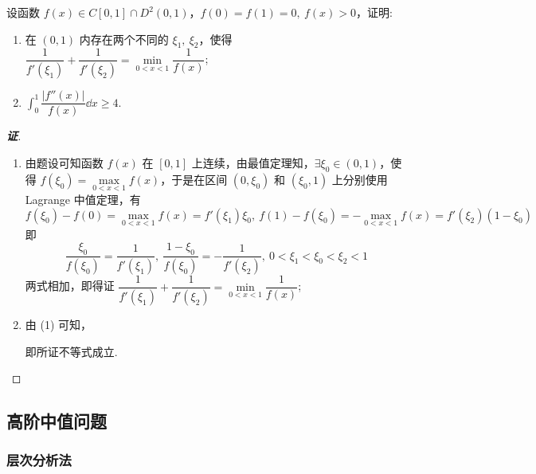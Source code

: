 \begin{example}
    设函数 $f(x)\in C[0,1]\cap D^2(0,1)$，$f(0)=f(1)=0,~f(x)>0$，证明:
    \begin{enumerate}[label=(\arabic{*})]
        \item 在 $(0,1)$ 内存在两个不同的 $\xi_1,~\xi_2$，使得 $\dfrac{1}{f'(\xi_1)}+\dfrac{1}{f'(\xi_2)}=\min\limits_{0<x<1}\dfrac{1}{f(x)}$;
        \item $\displaystyle\int_{0}^{1}\dfrac{|f''(x)|}{f(x)}\dd x\geqslant 4.$
    \end{enumerate}
\end{example}
\begin{proof}[{\songti \textbf{证}}]
    \begin{enumerate}[label=(\arabic{*})]
        \item 由题设可知函数 $f(x)$ 在 $[0,1]$ 上连续，由最值定理知，$\exists\xi_0\in(0,1)$，使得 $f(\xi_0)=\max\limits_{0<x<1}f(x)$，于是在区间 $(0,\xi_0)$ 和 $(\xi_0,1)$ 上分别使用 Lagrange 中值定理，有
              $$f(\xi_0)-f(0)=\max\limits_{0<x<1}f(x)=f'(\xi_1)\xi_0,~f(1)-f(\xi_0)=-\max\limits_{0<x<1}f(x)=f'(\xi_2)(1-\xi_0)$$
              即 $$\dfrac{\xi_0}{f(\xi_0)}=\dfrac{1}{f'(\xi_1)},~\dfrac{1-\xi_0}{f(\xi_0)}=-\dfrac{1}{f'(\xi_2)},~0<\xi_1<\xi_0<\xi_2<1$$
              两式相加，即得证 $\dfrac{1}{f'(\xi_1)}+\dfrac{1}{f'(\xi_2)}=\min\limits_{0<x<1}\dfrac{1}{f(x)}$;
        \item 由 (1) 可知，
              即所证不等式成立.
    \end{enumerate}
\end{proof}

\subsection{高阶中值问题}

\subsubsection{层次分析法}


